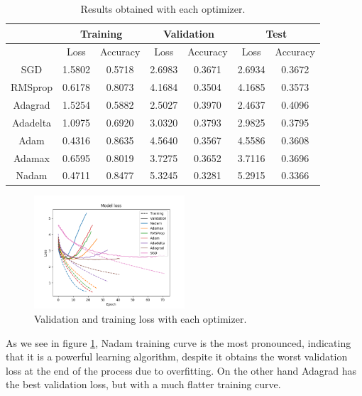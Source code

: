 \documentclass[]{article}
\begin{document}
\begin{table}[H]
	\centering
	\label{t:opt}
	\begin{tabular}{@{}ccccccc@{}}
		\toprule
		& \multicolumn{2}{c}{Training} & \multicolumn{2}{c}{Validation} & \multicolumn{2}{c}{Test} \\ \midrule
		& Loss         & Accuracy      & Loss          & Accuracy       & Loss       & Accuracy    \\
		\midrule
		SGD      & 1.5802       & 0.5718        & 2.6983        & 0.3671         & 2.6934     & 0.3672      \\
		RMSprop  & 0.6178       & 0.8073        & 4.1684        & 0.3504         & 4.1685     & 0.3573      \\
		Adagrad  & 1.5254       & 0.5882        & 2.5027        & 0.3970         & 2.4637     & 0.4096      \\
		Adadelta & 1.0975       & 0.6920        & 3.0320        & 0.3793         & 2.9825     & 0.3795      \\
		Adam     & 0.4316       & 0.8635        & 4.5640        & 0.3567         & 4.5586     & 0.3608      \\
		Adamax   & 0.6595       & 0.8019        & 3.7275        & 0.3652         & 3.7116     & 0.3696      \\
		Nadam    & 0.4711       & 0.8477        & 5.3245        & 0.3281         & 5.2915     & 0.3366      \\ \bottomrule
	\end{tabular}
	\caption{Results obtained with each optimizer.}
\end{table}

\begin{figure}[H]
	\centering
	\includegraphics[width=0.5\textwidth]{optimizer_loss}
	\caption{Validation and training loss with each optimizer.}
	\label{f:opt1}
\end{figure}

As we see in figure \ref{f:opt1}, Nadam training curve is the most pronounced, indicating that it is a powerful learning algorithm, despite it obtains the worst validation loss at the end of the process due to overfitting. On the other hand Adagrad has the best validation loss, but with a much flatter training curve.
\end{document}
